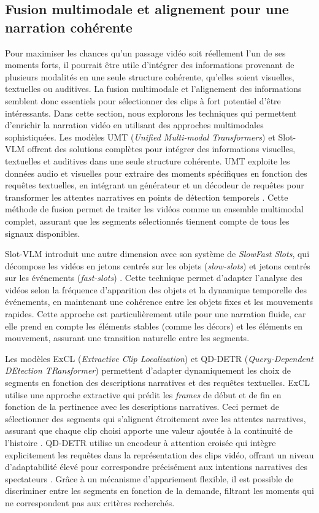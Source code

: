 \subsection{Fusion multimodale et alignement pour une narration cohérente}
Pour maximiser les chances qu’un passage vidéo soit réellement l’un de ses moments forts, il pourrait être utile d’intégrer des informations provenant de plusieurs modalités en une seule structure cohérente, qu’elles soient visuelles, textuelles ou auditives. La fusion multimodale et l’alignement des informations semblent donc essentiels pour sélectionner des clips à fort potentiel d’être intéressants. Dans cette section, nous explorons les techniques qui permettent d’enrichir la narration vidéo en utilisant des approches multimodales sophistiquées. Les modèles UMT (\textit{Unified Multi-modal Transformers}) \cite{liu2022_umt} et Slot-VLM \cite{xu2024} offrent des solutions complètes pour intégrer des informations visuelles, textuelles et auditives dans une seule structure cohérente. UMT exploite les données audio et visuelles pour extraire des moments spécifiques en fonction des requêtes textuelles, en intégrant un générateur et un décodeur de requêtes pour transformer les attentes narratives en points de détection temporels \cite{liu2022_umt}. Cette méthode de fusion permet de traiter les vidéos comme un ensemble multimodal complet, assurant que les segments sélectionnés tiennent compte de tous les signaux disponibles.

Slot-VLM introduit une autre dimension avec son système de \textit{SlowFast Slots}, qui décompose les vidéos en jetons centrés sur les objets (\textit{slow-slots}) et jetons centrés sur les événements (\textit{fast-slots}) \cite{xu2024}. Cette technique permet d’adapter l’analyse des vidéos selon la fréquence d’apparition des objets et la dynamique temporelle des événements, en maintenant une cohérence entre les objets fixes et les mouvements rapides. Cette approche est particulièrement utile pour une narration fluide, car elle prend en compte les éléments stables (comme les décors) et les éléments en mouvement, assurant une transition naturelle entre les segments.

Les modèles ExCL (\textit{Extractive Clip Localization}) \cite{ghosh2019_excl} et QD-DETR (\textit{Query-Dependent DEtection TRansformer}) \cite{sun2023_gptsee} permettent d’adapter dynamiquement les choix de segments en fonction des descriptions narratives et des requêtes textuelles. ExCL utilise une approche extractive qui prédit les \textit{frames} de début et de fin en fonction de la pertinence avec les descriptions narratives. Ceci permet de sélectionner des segments qui s’alignent étroitement avec les attentes narratives, assurant que chaque clip choisi apporte une valeur ajoutée à la continuité de l’histoire \cite{ghosh2019_excl}. QD-DETR utilise un encodeur à attention croisée qui intègre explicitement les requêtes dans la représentation des clips vidéo, offrant un niveau d’adaptabilité élevé pour correspondre précisément aux intentions narratives des spectateurs \cite{lei2021_moments}. Grâce à un mécanisme d’appariement flexible, il est possible de discriminer entre les segments en fonction de la demande, filtrant les moments qui ne correspondent pas aux critères recherchés.

